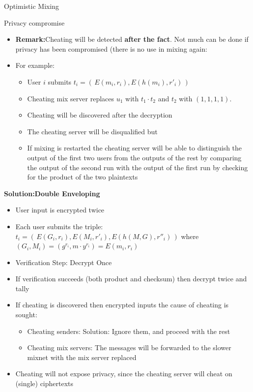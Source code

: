 \documentclass{beamer}
\begin{document}
\begin{frame}[allowframebreaks]{Optimistic Mixing \cite{Opt02}}
\begin{block}{Privacy compromise}
\begin{itemize}
\item \textbf{Remark:}Cheating will be detected \textbf{after the fact}. Not much can be done if privacy has been compromised (there is no use in mixing again:
\item For example:
\begin{itemize}
\item User $i$ submits $t_i = ( \, E(m_i,r_i), E(h(m_i),r'_i) \, )$
\item Cheating mix server replaces $u_1$ with $ t_1 \cdot t_2$ and $t_2$ with $(1,1,1,1)$.
\item Cheating will be discovered after the decryption
\item The cheating server will be disqualified but
\item If mixing is restarted the cheating server will be able to distinguish the output of the first two users from the outputs of the rest by comparing the output of the second run with the output of the first run by checking for the product of the two plaintexts
\end{itemize}
\end{itemize}
\end{block}

\framebreak

\textbf{Solution:Double Enveloping}
\begin{itemize}
\item User input is encrypted twice
\item Each user submits the triple: $ t_i = ( \, E(G_i,r_i), E(M_i,r'_i), E(h(M,G),r''_i) \, )$  where $(G_i,M_i) = (g^{r_i},m \cdot y^{r_i}) = E(m_i,r_i)$
\item Verification Step: Decrypt Once
\item If verification succeeds (both product and checksum) then decrypt twice and tally
\item If cheating is discovered then encrypted inputs the cause of cheating is sought:
\begin{itemize}
\item Cheating senders: Solution: Ignore them, and proceed with the rest
\item Cheating mix servers: The messages will be forwarded to the slower mixnet with the mix server replaced
\end{itemize}
\item Cheating will not expose privacy, since the cheating server will cheat on (single) ciphertexts
\end{itemize}



\end{frame}
\end{document}
